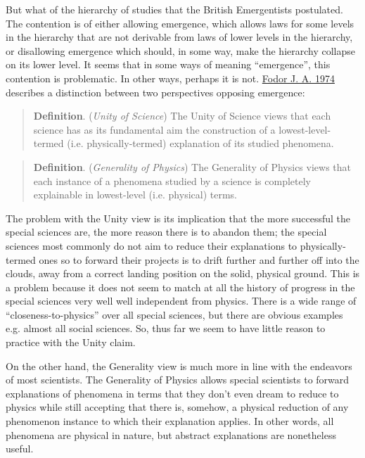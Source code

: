 \documentclass{article}
\newcommand{\ti}[1]{\textit{#1}}
\newcommand{\tb}[1]{\textbf{#1}}
\renewcommand{\cite}[1]{\hyperlink{#1}{#1}}
\begin{document}

But what of the hierarchy of studies that the British Emergentists postulated. The contention is of either allowing emergence, which allows laws for some levels in the hierarchy that are not derivable from laws of lower levels in the hierarchy, or disallowing emergence which should, in some way, make the hierarchy collapse on its lower level. It seems that in some ways of meaning ``emergence'', this contention is problematic. In other ways, perhaps it is not. \cite{Fodor J. A. 1974} describes a distinction between two perspectives opposing emergence:

\begin{quote}
    \tb{Definition}. (\ti{Unity of Science}) The Unity of Science views that each science has as its fundamental aim the construction of a lowest-level-termed (i.e. physically-termed) explanation of its studied phenomena.
\end{quote}

\begin{quote}
    \tb{Definition}. (\ti{Generality of Physics}) The Generality of Physics views that each instance of a phenomena studied by a science is completely explainable in lowest-level (i.e. physical) terms.
\end{quote}

The problem with the Unity view is its implication that the more successful the special sciences are, the more reason there is to abandon them; the special sciences most commonly do not aim to reduce their explanations to physically-termed ones so to forward their projects is to drift further and further off into the clouds, away from a correct landing position on the solid, physical ground. This is a problem because it does not seem to match at all the history of progress in the special sciences very well well independent from physics. There is a wide range of ``closeness-to-physics'' over all special sciences, but there are obvious examples e.g. almost all social sciences. So, thus far we seem to have little reason to practice with the Unity claim.

On the other hand, the Generality view is much more in line with the endeavors of most scientists. The Generality of Physics allows special scientists to forward explanations of phenomena in terms that they don't even dream to reduce to physics while still accepting that there is, somehow, a physical reduction of any phenomenon instance to which their explanation applies. In other words, all phenomena are physical in nature, but abstract explanations are nonetheless useful.
\end{document}

